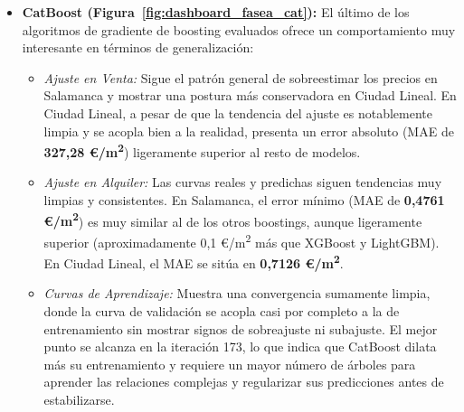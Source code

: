 \documentclass[a4paper,11pt,openany]{book}
\begin{document}
\begin{itemize}
\begin{itemize}
        \item \textit{Ajuste en Alquiler:} La tendencia coincide casi plenamente con la de LightGBM. Sin embargo, XGBoost demuestra ser aún más preciso en Ciudad Lineal en la predicción del mes de marzo de 2026, acoplándose con gran exactitud a la realidad. Las tendencias limpias confirman que los modelos de gradiente de boosting generalizan de manera muy superior y eliminan los problemas de ajuste local de Random Forest.
        \item \textit{Curvas de Aprendizaje:} A diferencia de los otros modelos, en XGBoost la línea de validación se mantiene de forma consistente por encima de la de entrenamiento en todo momento, confirmando la \textbf{ausencia absoluta de subajuste (\textit{underfitting})}. En venta, alcanza su mejor iteración en el árbol 98 (con un RMSE de \textbf{171,81 €/m\textsuperscript{2}}). En alquiler, la mejor iteración se dilata hasta el árbol 133 (en comparación con 107 en LightGBM y 30 en Random Forest), indicando que el algoritmo prolonga su capacidad de aprendizaje antes de alcanzar el error óptimo de validación, registrando un RMSE de \textbf{0,64 €/m\textsuperscript{2}}.
    \end{itemize}
    \item \textbf{CatBoost (Figura~\ref{fig:dashboard_fasea_cat}):} El último de los algoritmos de gradiente de boosting evaluados ofrece un comportamiento muy interesante en términos de generalización:
    \begin{itemize}
        \item \textit{Ajuste en Venta:} Sigue el patrón general de sobreestimar los precios en Salamanca y mostrar una postura más conservadora en Ciudad Lineal. En Ciudad Lineal, a pesar de que la tendencia del ajuste es notablemente limpia y se acopla bien a la realidad, presenta un error absoluto (MAE de \textbf{327,28 €/m\textsuperscript{2}}) ligeramente superior al resto de modelos.
        \item \textit{Ajuste en Alquiler:} Las curvas reales y predichas siguen tendencias muy limpias y consistentes. En Salamanca, el error mínimo (MAE de \textbf{0,4761 €/m\textsuperscript{2}}) es muy similar al de los otros boostings, aunque ligeramente superior (aproximadamente 0,1 €/m\textsuperscript{2} más que XGBoost y LightGBM). En Ciudad Lineal, el MAE se sitúa en \textbf{0,7126 €/m\textsuperscript{2}}.
        \item \textit{Curvas de Aprendizaje:} Muestra una convergencia sumamente limpia, donde la curva de validación se acopla casi por completo a la de entrenamiento sin mostrar signos de sobreajuste ni subajuste. El mejor punto se alcanza en la iteración 173, lo que indica que CatBoost dilata más su entrenamiento y requiere un mayor número de árboles para aprender las relaciones complejas y regularizar sus predicciones antes de estabilizarse.
    \end{itemize}
\end{itemize}
\end{document}
